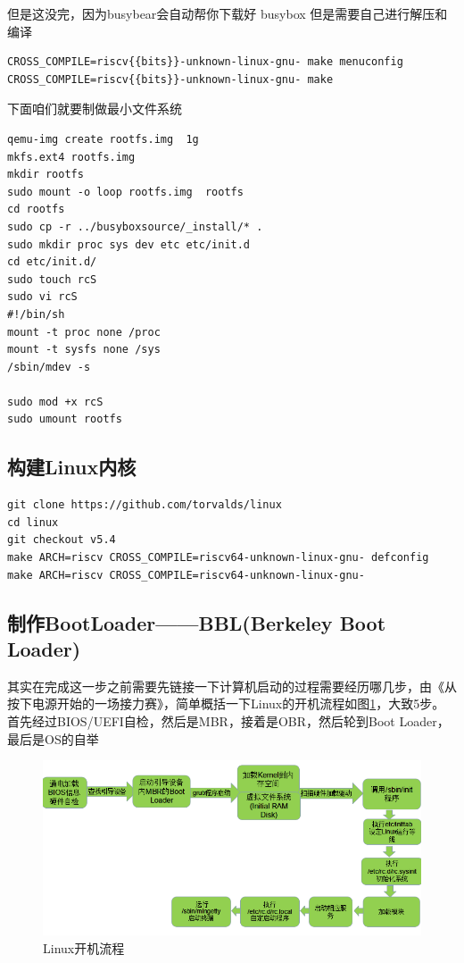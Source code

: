 但是这没完，因为busybear会自动帮你下载好 busybox 但是需要自己进行解压和编译

\begin{lstlisting}
CROSS_COMPILE=riscv{{bits}}-unknown-linux-gnu- make menuconfig
CROSS_COMPILE=riscv{{bits}}-unknown-linux-gnu- make
\end{lstlisting}

下面咱们就要制做最小文件系统
\begin{lstlisting}
qemu-img create rootfs.img  1g
mkfs.ext4 rootfs.img
mkdir rootfs
sudo mount -o loop rootfs.img  rootfs
cd rootfs
sudo cp -r ../busyboxsource/_install/* .
sudo mkdir proc sys dev etc etc/init.d
cd etc/init.d/
sudo touch rcS
sudo vi rcS
#!/bin/sh
mount -t proc none /proc
mount -t sysfs none /sys
/sbin/mdev -s

sudo mod +x rcS
sudo umount rootfs
\end{lstlisting}

\subsection{构建Linux内核}
\begin{lstlisting}
git clone https://github.com/torvalds/linux
cd linux
git checkout v5.4
make ARCH=riscv CROSS_COMPILE=riscv64-unknown-linux-gnu- defconfig
make ARCH=riscv CROSS_COMPILE=riscv64-unknown-linux-gnu-
\end{lstlisting}

\subsection{制作BootLoader——BBL(Berkeley Boot Loader)}
其实在完成这一步之前需要先链接一下计算机启动的过程需要经历哪几步，由《从按下电源开始的一场接力赛》\cite{从按下电源开始的一场接力赛}，简单概括一下Linux的开机流程如图\ref{fig:Linux_boot}，大致5步。首先经过BIOS/UEFI自检，然后是MBR，接着是OBR，然后轮到Boot Loader，最后是OS的自举

\begin{figure}[htbp]
  \centering %
  \includegraphics[width=0.9 \textwidth]{figs/Process/Linux开机流程.png}
  \caption{Linux开机流程}
  \label{fig:Linux_boot} %
\end{figure}

